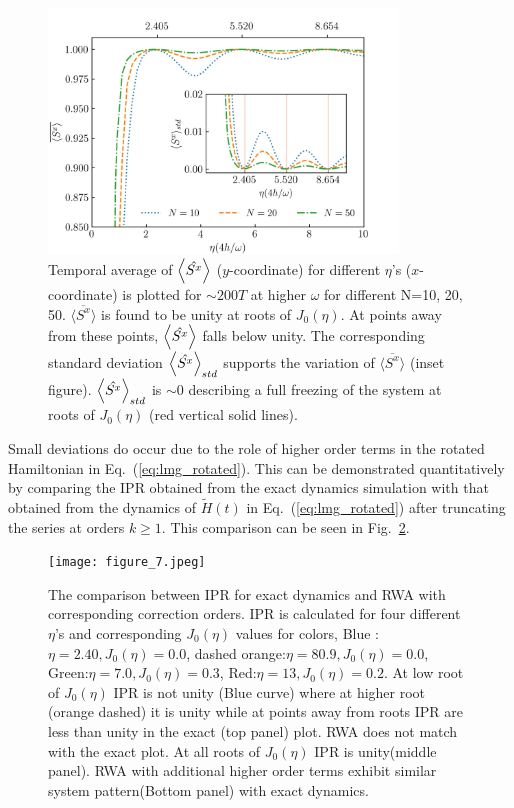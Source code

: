 \documentclass[%
reprint,
superscriptaddress,
amsmath,amssymb,
aps,
prb,
showkeys,
]{revtex4-2}
\begin{document}
\begin{figure}[t!]
	\centering
	\includegraphics[width=9.3cm]{figure_6.jpeg}
	\caption{Temporal average of $\expval{\hat{S^x}}$ ($y$-coordinate) for different $\eta$'s ($x$-coordinate) is plotted for $\sim 200T$ at higher $\omega$ for different N=10, 20, 50. $\overline{\langle S^x \rangle}$ is found to be unity at roots of $J_0(\eta)$. At points away from these points, $\expval{\hat{S^x}}$ falls below unity. The corresponding standard deviation $\expval{\hat{S^x}}_{std}$ supports the variation of $\overline{\langle S^x \rangle}$ (inset figure). $\expval{\hat{S^x}}_{std}$ is $\sim 0$ describing a full freezing of the system at roots of $J_0(\eta)$ (red vertical solid lines).}
	\label{fig:sx_conserve}
\end{figure}
Small deviations do occur due to the role of  higher order terms in the rotated Hamiltonian in Eq.~(\ref{eq:lmg_rotated}). This can be demonstrated quantitatively by comparing the IPR obtained from the exact dynamics simulation with that obtained from the dynamics of $\tilde{H}(t)$ in Eq.~(\ref{eq:lmg_rotated}) after truncating the series at orders $k\geq 1$. This comparison can be seen in Fig.~\ref{fig:lmg_ipr_rwa11}.
\begin{figure}[t!]
	\centering
	\texttt{[image: figure\_7.jpeg]}
	\caption{The comparison between IPR for exact dynamics and RWA with corresponding correction orders. IPR is calculated for four different $\eta$'s and corresponding $J_0(\eta)$ values for colors, Blue :$\eta = 2.40, J_0(\eta) = 0.0$, dashed orange:$\eta = 80.9, J_0(\eta) = 0.0$, Green:$\eta =7.0, J_0(\eta) = 0.3$, Red:$\eta = 13, J_0(\eta)= 0. 2$. At low root of $J_0(\eta)$ IPR is not unity (Blue curve) where at higher root (orange dashed) it is unity while at points away from roots IPR are less than unity in the exact (top panel) plot. RWA does not match with the exact plot. At all roots of $J_0(\eta)$ IPR is unity(middle panel). RWA with additional higher order terms exhibit similar system pattern(Bottom panel) with exact dynamics.}
	\label{fig:lmg_ipr_rwa11}
\end{figure}
\end{document}
